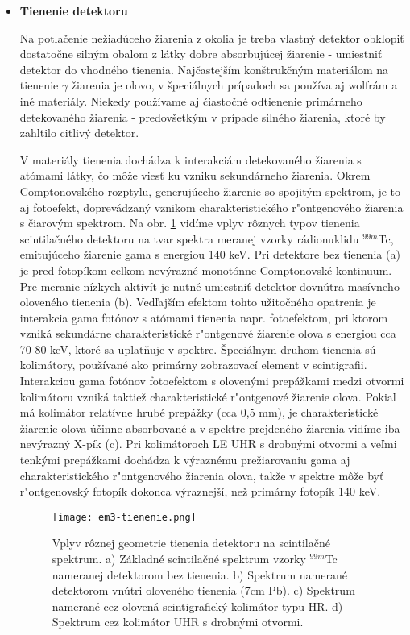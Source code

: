 \documentclass[../../main.tex]{subfiles}
\begin{document}
\begin{itemize}
\item \textbf{Tienenie detektoru}

Na potlačenie nežiadúceho žiarenia z okolia je treba vlastný detektor obklopiť dostatočne silným obalom z látky dobre absorbujúcej žiarenie - umiestniť detektor do vhodného tienenia. Najčastejším  konštrukčným materiálom na tienenie $\gamma$ žiarenia je olovo, v špeciálnych prípadoch sa používa aj wolfrám a iné materiály. Niekedy používame aj čiastočné odtienenie primárneho detekovaného žiarenia - predovšetkým v prípade silného žiarenia, ktoré by zahltilo citlivý detektor.

V materiály tienenia dochádza k interakciám detekovaného žiarenia s atómami látky, čo môže viesť ku vzniku sekundárneho žiarenia. Okrem Comptonovského rozptylu, generujúceho žiarenie so spojitým spektrom, je to aj fotoefekt, doprevádzaný vznikom charakteristického r"ontgenového žiarenia s čiarovým spektrom. Na obr. \ref{em3:img:tienenie} vidíme vplyv rôznych typov tienenia scintilačného detektoru na tvar spektra meranej vzorky rádionuklidu $^{99m}$Tc, emitujúceho žiarenie gama s energiou 140 keV. Pri detektore bez tienenia (a) je pred fotopíkom celkom nevýrazné monotónne Comptonovské kontinuum. Pre meranie nízkych aktivít je nutné umiestniť detektor dovnútra masívneho oloveného tienenia (b). Vedľajším efektom tohto užitočného opatrenia je interakcia gama fotónov s atómami tienenia napr. fotoefektom, pri ktorom vzniká sekundárne charakteristické r"ontgenové žiarenie olova s energiou cca 70-80 keV, ktoré sa uplatňuje v spektre. Špeciálnym druhom tienenia sú kolimátory, používané ako primárny zobrazovací element v scintigrafii. Interakciou gama fotónov fotoefektom s olovenými prepážkami medzi otvormi kolimátoru vzniká taktiež charakteristické r"ontgenové žiarenie olova. Pokiaľ má kolimátor relatívne hrubé prepážky (cca 0,5 mm), je charakteristické žiarenie olova účinne absorbované a v spektre prejdeného žiarenia vidíme iba nevýrazný X-pík (c). Pri kolimátoroch LE UHR s drobnými otvormi a veľmi tenkými prepážkami dochádza k výraznému prežiarovaniu gama aj charakteristického r"ontgenového žiarenia olova, takže v spektre môže byť r"ontgenovský fotopík dokonca výraznejší, než primárny fotopík 140 keV.

\begin{figure}[h]
\centering
\texttt{[image: em3-tienenie.png]}
\caption{Vplyv rôznej geometrie tienenia detektoru na scintilačné spektrum. a) Základné scintilačné spektrum vzorky $^{99m}$Tc nameranej detektorom bez tienenia. b) Spektrum namerané detektorom vnútri oloveného tienenia (7cm Pb). c) Spektrum namerané cez olovená scintigrafický kolimátor typu HR. d) Spektrum cez kolimátor UHR s drobnými otvormi.}
\label{em3:img:tienenie}
\end{figure}


\end{itemize}
\end{document}
